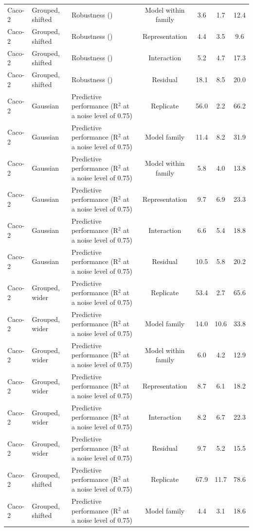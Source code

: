 \begin{landscape}
{\begin{longtable}{lllcccc}
Caco-2 & Grouped, shifted & Robustness (\aucnorm{}) & Model within family & 3.6 & 1.7 & 12.4 \\
Caco-2 & Grouped, shifted & Robustness (\aucnorm{}) & Representation & 4.4 & 3.5 & 9.6 \\
Caco-2 & Grouped, shifted & Robustness (\aucnorm{}) & Interaction & 5.2 & 4.7 & 17.3 \\
Caco-2 & Grouped, shifted & Robustness (\aucnorm{}) & Residual & 18.1 & 8.5 & 20.0 \\
Caco-2 & Gaussian & Predictive performance (R$^2$ at a noise level of 0.75) & Replicate & 56.0 & 2.2 & 66.2 \\
Caco-2 & Gaussian & Predictive performance (R$^2$ at a noise level of 0.75) & Model family & 11.4 & 8.2 & 31.9 \\
Caco-2 & Gaussian & Predictive performance (R$^2$ at a noise level of 0.75) & Model within family & 5.8 & 4.0 & 13.8 \\
Caco-2 & Gaussian & Predictive performance (R$^2$ at a noise level of 0.75) & Representation & 9.7 & 6.9 & 23.3 \\
Caco-2 & Gaussian & Predictive performance (R$^2$ at a noise level of 0.75) & Interaction & 6.6 & 5.4 & 18.8 \\
Caco-2 & Gaussian & Predictive performance (R$^2$ at a noise level of 0.75) & Residual & 10.5 & 5.8 & 20.2 \\
Caco-2 & Grouped, wider & Predictive performance (R$^2$ at a noise level of 0.75) & Replicate & 53.4 & 2.7 & 65.6 \\
Caco-2 & Grouped, wider & Predictive performance (R$^2$ at a noise level of 0.75) & Model family & 14.0 & 10.6 & 33.8 \\
Caco-2 & Grouped, wider & Predictive performance (R$^2$ at a noise level of 0.75) & Model within family & 6.0 & 4.2 & 12.9 \\
Caco-2 & Grouped, wider & Predictive performance (R$^2$ at a noise level of 0.75) & Representation & 8.7 & 6.1 & 18.2 \\
Caco-2 & Grouped, wider & Predictive performance (R$^2$ at a noise level of 0.75) & Interaction & 8.2 & 6.7 & 22.3 \\
Caco-2 & Grouped, wider & Predictive performance (R$^2$ at a noise level of 0.75) & Residual & 9.7 & 5.2 & 15.5 \\
Caco-2 & Grouped, shifted & Predictive performance (R$^2$ at a noise level of 0.75) & Replicate & 67.9 & 11.7 & 78.6 \\
Caco-2 & Grouped, shifted & Predictive performance (R$^2$ at a noise level of 0.75) & Model family & 4.4 & 3.1 & 18.6 \\

\end{longtable}}
\end{landscape}

